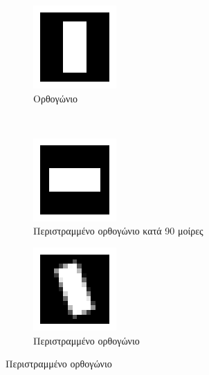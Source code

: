 \begin{figure}
        \centering
        \begin{subfigure}[t]{0.3\textwidth}
                \centerline{\includegraphics[scale = 0.5]{./images/examples/orthogwnio.png}}
                \caption{Ορθογώνιο}
        \end{subfigure}%
        ~
        \centering
        \begin{subfigure}[t]{0.3\textwidth}
                \centerline{\includegraphics[scale = 0.5]{./images/examples/orthogwnio90.png}}
                \caption{Περιστραμμένο ορθογώνιο κατά 90 μοίρες}
        \end{subfigure}%
        \centering
        \begin{subfigure}[t]{0.3\textwidth}
                \centerline{\includegraphics[scale = 0.5]{./images/examples/Rotatedorthogwnio.png}}
                \caption{Περιστραμμένο ορθογώνιο}
        \end{subfigure}%


\end{figure}
